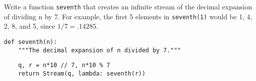 \question Write a function \lstinline$seventh$ that creates an infinite
stream of the decimal expansion of dividing n by 7.
For example, the first 5 elements in \lstinline$seventh(1)$ would be
1, 4, 2, 8, and 5, since $1/7 = .14285$.

\begin{lstlisting}
def seventh(n):
    """The decimal expansion of n divided by 7."""
\end{lstlisting}
\begin{solution}[1.5cm]
\begin{lstlisting}
    q, r = n*10 // 7, n*10 % 7
    return Stream(q, lambda: seventh(r))
\end{lstlisting}
\end{solution}
